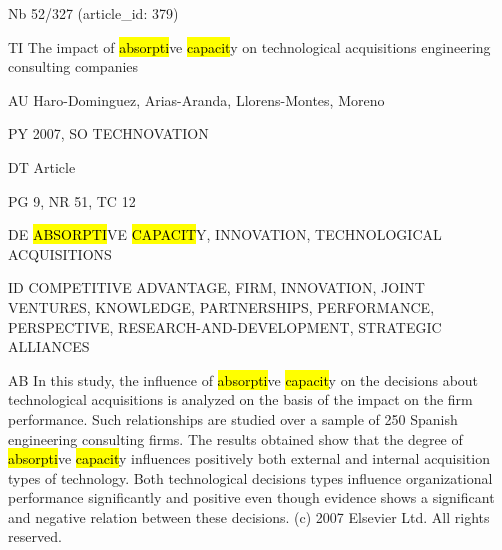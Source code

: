 \documentclass[a4paper]{article}
\begin{document}
\vspace*{-2cm}
Nb \tabto{0cm}52/327 (article\_id: 379)\par
TI \tabto{0cm}The impact of \hl{absorpti}ve \hl{capacit}y on technological acquisitions engineering consulting companies\par
AU \tabto{0cm}Haro-Dominguez, Arias-Aranda, Llorens-Montes, Moreno\par
PY \tabto{0cm}2007, SO TECHNOVATION\par
DT \tabto{0cm}Article\par
PG \tabto{0cm}9, NR 51, TC 12\par
DE \tabto{0cm}\hl{ABSORPTI}VE \hl{CAPACIT}Y, INNOVATION, TECHNOLOGICAL ACQUISITIONS\par
ID \tabto{0cm}COMPETITIVE ADVANTAGE, FIRM, INNOVATION, JOINT VENTURES, KNOWLEDGE, PARTNERSHIPS, PERFORMANCE, PERSPECTIVE, RESEARCH-AND-DEVELOPMENT, STRATEGIC ALLIANCES\par
AB \tabto{0cm}In this study, the influence of \hl{absorpti}ve \hl{capacit}y on the decisions about technological acquisitions is analyzed on the basis of the impact on the firm performance. Such relationships are studied over a sample of 250 Spanish engineering consulting firms. The results obtained show that the degree of \hl{absorpti}ve \hl{capacit}y influences positively both external and internal acquisition types of technology. Both technological decisions types influence organizational performance significantly and positive even though evidence shows a significant and negative relation between these decisions. (c) 2007 Elsevier Ltd. All rights reserved.\par
\clearpage
\end{document}
